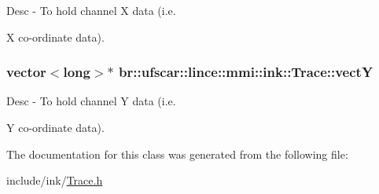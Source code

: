 Desc -\/ To hold channel X data (i.e. 

X co-\/ordinate data). \hypertarget{classbr_1_1ufscar_1_1lince_1_1mmi_1_1ink_1_1Trace_a6914065da435b344151f55f6d60a7fdd}{
\subsubsection[{vectY}]{\setlength{\rightskip}{0pt plus 5cm}vector$<$long$>$$\ast$ {\bf br::ufscar::lince::mmi::ink::Trace::vectY}}}
\label{classbr_1_1ufscar_1_1lince_1_1mmi_1_1ink_1_1Trace_a6914065da435b344151f55f6d60a7fdd}


Desc -\/ To hold channel Y data (i.e. 

Y co-\/ordinate data). 

The documentation for this class was generated from the following file:\begin{DoxyCompactItemize}
\item 
include/ink/\hyperlink{Trace_8h}{Trace.h}\end{DoxyCompactItemize}
